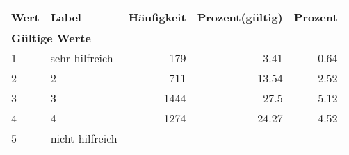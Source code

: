      \begin{longtable}{lXrrr}
     \toprule
     \textbf{Wert} & \textbf{Label} & \textbf{Häufigkeit} & \textbf{Prozent(gültig)} & \textbf{Prozent} \\
     \endhead
     \midrule
     \multicolumn{5}{l}{\textbf{Gültige Werte}}\\

     1 &
     \multicolumn{1}{X}{ sehr hilfreich   } &


       \num{179} &
       \num[round-mode=places,round-precision=2]{3.41} &
         \num[round-mode=places,round-precision=2]{0.64} \\

     2 &
     \multicolumn{1}{X}{ 2   } &


       \num{711} &
       \num[round-mode=places,round-precision=2]{13.54} &
         \num[round-mode=places,round-precision=2]{2.52} \\

     3 &
     \multicolumn{1}{X}{ 3   } &


       \num{1444} &
       \num[round-mode=places,round-precision=2]{27.5} &
         \num[round-mode=places,round-precision=2]{5.12} \\

     4 &
     \multicolumn{1}{X}{ 4   } &


       \num{1274} &
       \num[round-mode=places,round-precision=2]{24.27} &
         \num[round-mode=places,round-precision=2]{4.52} \\

     5 &
     \multicolumn{1}{X}{ nicht hilfreich   } &



\end{longtable}
